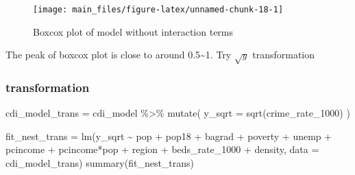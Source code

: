 \documentclass[
  11pt,
]{article}
\newenvironment{Shaded}{\begin{snugshade}}{\end{snugshade}}
\newcommand{\AttributeTok}[1]{\textcolor[rgb]{0.77,0.63,0.00}{#1}}
\newcommand{\FunctionTok}[1]{\textcolor[rgb]{0.00,0.00,0.00}{#1}}
\newcommand{\NormalTok}[1]{#1}
\newcommand{\OtherTok}[1]{\textcolor[rgb]{0.56,0.35,0.01}{#1}}
\newcommand{\SpecialCharTok}[1]{\textcolor[rgb]{0.00,0.00,0.00}{#1}}
\begin{document}
\begin{figure}
\texttt{[image: main\_files/figure-latex/unnamed-chunk-18-1]} \caption{\label{fig:figs}Boxcox plot of model without interaction terms}\label{fig:unnamed-chunk-18}
\end{figure}

The peak of boxcox plot is close to around 0.5\textasciitilde1. Try
\(\sqrt{y}\) transformation

\hypertarget{transformation}{%
\subsubsection{transformation}\label{transformation}}

\begin{Shaded}
\begin{Highlighting}[]
\NormalTok{cdi\_model\_trans }\OtherTok{=}\NormalTok{ cdi\_model }\SpecialCharTok{\%\textgreater{}\%} 
  \FunctionTok{mutate}\NormalTok{(}
    \AttributeTok{y\_sqrt =} \FunctionTok{sqrt}\NormalTok{(crime\_rate\_1000)}
\NormalTok{  )}

\NormalTok{fit\_nest\_trans }\OtherTok{=} \FunctionTok{lm}\NormalTok{(y\_sqrt }\SpecialCharTok{\textasciitilde{}}  
\NormalTok{                   pop }\SpecialCharTok{+}\NormalTok{ pop18 }\SpecialCharTok{+}\NormalTok{ bagrad }\SpecialCharTok{+}
\NormalTok{                  poverty }\SpecialCharTok{+}\NormalTok{ unemp }\SpecialCharTok{+}\NormalTok{ pcincome }\SpecialCharTok{+}\NormalTok{ pcincome}\SpecialCharTok{*}\NormalTok{pop }\SpecialCharTok{+}\NormalTok{ region }\SpecialCharTok{+}
\NormalTok{                  beds\_rate\_1000 }\SpecialCharTok{+}\NormalTok{ density, }\AttributeTok{data =}\NormalTok{ cdi\_model\_trans)}
\FunctionTok{summary}\NormalTok{(fit\_nest\_trans)}
\end{Highlighting}
\end{Shaded}
\end{document}
